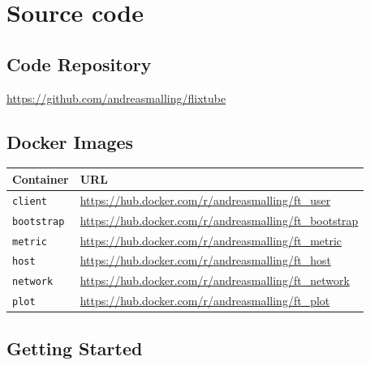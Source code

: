 \chapter{Source code}
\label{app:code}

\section{Code Repository}
\label{app:code_repo}

\url{https://github.com/andreasmalling/flixtube}

\section{Docker Images}
\begin{table}[ht]
\centering
    \begin{tabular}{ll}
        \toprule 
        Container           & URL                                                       \\
        \midrule
        \texttt{client}     & \url{https://hub.docker.com/r/andreasmalling/ft_user}     \\
        \texttt{bootstrap}  & \url{https://hub.docker.com/r/andreasmalling/ft_bootstrap}\\
        \texttt{metric}     & \url{https://hub.docker.com/r/andreasmalling/ft_metric}   \\
        \texttt{host}       & \url{https://hub.docker.com/r/andreasmalling/ft_host}     \\
        \texttt{network}    & \url{https://hub.docker.com/r/andreasmalling/ft_network}  \\
        \texttt{plot}       & \url{https://hub.docker.com/r/andreasmalling/ft_plot}     \\
        \bottomrule
    \end{tabular}
\end{table}

\section{Getting Started}
\label{app:getting_started}

